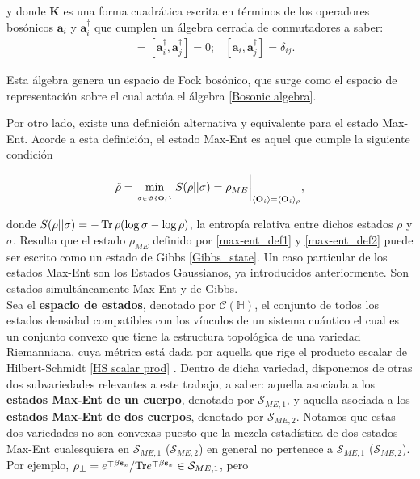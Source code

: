 \documentclass{report} %
\newcommand{\lgg}{\langle}
\newcommand{\rgg}{\rangle}
\numberwithin{equation}{section}
\begin{document}
\begin{Omitir}
y donde $\mathbf{K}$ es una forma cuadrática escrita en términos de los operadores bosónicos $\mathbf{a}_i$ y $\mathbf{a}_i^{\dagger}$ que cumplen un álgebra cerrada de conmutadores a saber:
\begin{align}
    [\mathbf{a}_i,\mathbf{a}_j] & = [\mathbf{a}_i^{\dagger},\mathbf{a}_j^{\dagger}] =0;  &  [\mathbf{a}_i, \mathbf{a}_j^{\dagger}] = \delta_{ij}.
    \label{Bosonic algebra}
\end{align}

Esta álgebra genera un espacio de Fock bosónico, que surge como el espacio de representación sobre el cual actúa el álgebra \eqref{Bosonic algebra}. 
\end{Omitir}

Por otro lado, existe una definición alternativa y equivalente para el estado Max-Ent. Acorde a esta definición, el estado Max-Ent es aquel que cumple la siguiente condición 

\begin{equation}
\tilde{\rho} = \min_{\atop{\sigma \in \mathfrak{G}\{{\bf O}_i\}}} S(\rho || \sigma) = \rho_{ME} \bigg|_{\lgg {\bf O}_i\rgg = \lgg {\bf O}_i\rgg_{\rho}},   
\label{max-ent_def2}
\end{equation}

donde $S(\rho||\sigma) = - \Tr \rho (\log \sigma - \log \rho)$, la entropía relativa entre dichos estados $\rho$ y $\sigma$. Resulta que el estado $\rho_{ME}$ definido por \eqref{max-ent_def1} y \eqref{max-ent_def2} puede ser escrito como un estado de Gibbs \eqref{Gibbs_state}. Un caso particular de los estados Max-Ent son los Estados Gaussianos, ya introducidos anteriormente. 
Son estados simultáneamente Max-Ent y de Gibbs. \\

Sea el \textbf{espacio de estados}, denotado por $\mathcal{C}(\mathds{H})$, el conjunto de todos los estados densidad compatibles con los vínculos de un sistema cuántico el cual es un conjunto convexo que tiene la estructura topológica de una variedad Riemanniana, cuya métrica está dada por aquella que rige el producto escalar de Hilbert-Schmidt \eqref{HS scalar prod} \cite{Nielsen.00, NakaharaM}. Dentro de dicha variedad, disponemos de otras dos subvariedades relevantes a este trabajo, a saber: aquella asociada a los \textbf{estados Max-Ent de un cuerpo}, denotado por $\mathcal{S}_{ME,1}$, y aquella asociada a los \textbf{estados Max-Ent de dos cuerpos}, denotado por $\mathcal{S}_{ME,2}$. Notamos que estas dos variedades no son convexas puesto que la  mezcla estadística de dos estados Max-Ent cualesquiera en $\mathcal{S}_{ME,1}$ ($\mathcal{S}_{ME,2}$) en general no pertenece a $\mathcal{S}_{ME,1}$ ($\mathcal{S}_{ME,2}$). Por ejemplo, $\rho_{\pm}=e^{\mp \beta{\bf s}_x}/{\Tr}e^{\mp \beta{\bf s}_x} \in \mathcal{S}_{ME,1}$,  pero
\end{document}

